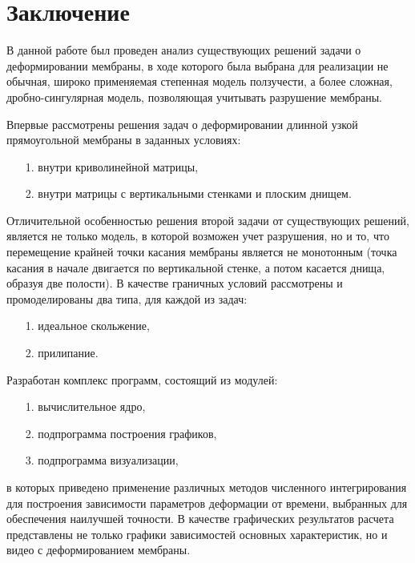 \chapter*{Заключение}
В данной работе был проведен анализ существующих решений задачи о деформировании 
мембраны, в ходе которого была выбрана для реализации не обычная, широко применяемая 
степенная модель ползучести, а более сложная, дробно-сингулярная модель, позволяющая 
учитывать разрушение мембраны.

Впервые рассмотрены решения задач о деформировании длинной узкой прямоугольной мембраны в заданных условиях:
\begin{itemize}
\item[1.] внутри криволинейной матрицы,
\item[2.] внутри матрицы с вертикальными стенками и плоским днищем.
\end{itemize}
Отличительной особенностью решения второй задачи от существующих решений, является
не только модель, в которой возможен учет разрушения, но и то, что перемещение крайней точки касания мембраны является
 не монотонным (точка касания в начале двигается по вертикальной стенке, а потом касается днища, образуя две полости). В качестве граничных условий рассмотрены и промоделированы два типа, для каждой из задач:
\begin{itemize}
\item[1.] идеальное скольжение,
\item[2.] прилипание.
\end{itemize}

\medskip
Разработан комплекс программ, состоящий из модулей:
\begin{itemize}
\item[1.] вычислительное ядро,
\item[2.] подпрограмма построения графиков, 
\item[3.] подпрограмма визуализации,
\end{itemize}
 в которых приведено применение  различных методов 
численного интегрирования для построения зависимости параметров деформации от времени, 
выбранных для обеспечения наилучшей точности. В качестве графических результатов 
расчета представлены не только графики зависимостей основных характеристик, но и видео 
с деформированием мембраны.

